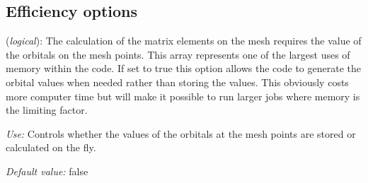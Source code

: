 \vspace{5pt}
\subsection{Efficiency options}

\begin{description}
\itemsep 10pt
\parsep 0pt

\item[\textbf{DirectPhi}] (\textit{logical}):
The calculation of the matrix elements on the mesh requires the
value of the orbitals on the mesh points. This array represents one of
the largest uses of memory within the code. If set to true this option
allows the code to generate the orbital values when needed rather than
storing the values. This obviously costs more computer time but will
make it possible to run larger jobs where memory is the limiting factor.

\textit{Use:} Controls whether the values of the orbitals at the mesh points
  are stored or calculated on the fly.

\textit{Default value:}  false

\end{description}

